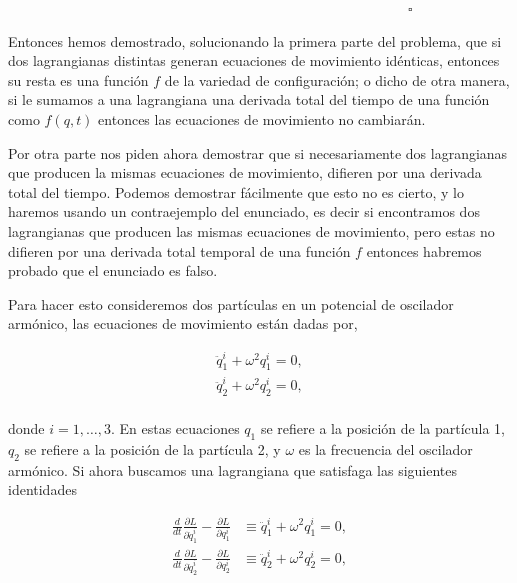 \documentclass[a4paper,10pt]{article}
\numberwithin{equation}{section}
\begin{document}
\vspace{.2cm} $\hspace{12cm} \square$

Entonces hemos demostrado, solucionando la primera parte del problema, que si dos 
lagrangianas distintas generan ecuaciones de movimiento idénticas, entonces su resta 
es una función $f$ de la variedad de configuración; o dicho de otra manera, si le sumamos a una lagrangiana una derivada total del tiempo
de una función como $f(q,t)$ entonces las ecuaciones de movimiento no cambiarán.

\vspace{.3cm}

Por otra parte nos piden ahora demostrar que si necesariamente dos lagrangianas que 
producen la mismas ecuaciones de movimiento, difieren por una derivada total del tiempo.
Podemos demostrar fácilmente que esto no es cierto, y lo haremos usando un contraejemplo 
del enunciado, es decir si encontramos dos lagrangianas que producen las mismas 
ecuaciones de movimiento, pero estas no difieren por una derivada total temporal 
de una función $f$ entonces habremos probado que el enunciado es falso.

\vspace{.3cm}

Para hacer esto consideremos dos partículas en un potencial de oscilador armónico,
las ecuaciones de movimiento están dadas por,

\begin{align}
 \ddot{q}^i_1 + \omega^2 q^i_1 = 0, \\
 \ddot{q}^i_2 + \omega^2 q^i_2 = 0, \\ 
\end{align}

donde $i = 1,\dots,3$. En estas ecuaciones $q_1$ se refiere a la posición de la 
partícula 1, $q_2$ se refiere a la posición de la partícula 2, y $\omega$ es la frecuencia 
del oscilador armónico. Si ahora buscamos una lagrangiana que satisfaga las siguientes 
identidades

\begin{align}
 \frac{d}{dt}\frac{\partial L}{\partial \dot{q}^i_1} - \frac{\partial L}{\partial q^i_1} 
 &\equiv  \ddot{q}^i_1 + \omega^2 q^i_1 = 0, \\
 \frac{d}{dt}\frac{\partial L}{\partial \dot{q}^i_2} - \frac{\partial L}{\partial q^i_2} 
 &\equiv  \ddot{q}^i_2 + \omega^2 q^i_2 = 0, \\
\end{align}
\end{document}

